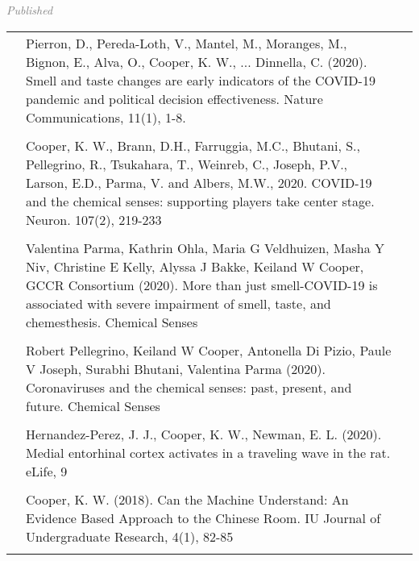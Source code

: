 \documentclass[11pt]{cooperCV_v1/cooperCV} %
\begin{document}
\begin{minipage}{\textwidth}
\begin{tabular}{ p{} %
                     p{} 
                     p{}}
    \end{tabular}
  

   
  \textcolor{gray}{{\emph{Published}}} 
  
   
    \begin{tabular}{ p{} %
                     p{} 
                     p{}} %
    
      \small\textcolor{gray}{{\emph{  }}} & {Pierron, D., Pereda-Loth, V., Mantel, M., Moranges, M., Bignon, E., Alva, O.,  Cooper, K. W., ... Dinnella, C. (2020). Smell and taste changes are early indicators of the COVID-19 pandemic and political decision effectiveness. Nature Communications, 11(1), 1-8.} & {\hfill \small{ }} \\ \\
    
      \small\textcolor{gray}{{\emph{  }}} & {Cooper, K. W., Brann, D.H., Farruggia, M.C., Bhutani, S., Pellegrino, R., Tsukahara, T., Weinreb, C., Joseph, P.V., Larson, E.D., Parma, V. and Albers, M.W., 2020. COVID-19 and the chemical senses: supporting players take center stage. Neuron. 107(2), 219-233} & {\hfill \small{ }} \\ \\
    
      \small\textcolor{gray}{{\emph{  }}} & {Valentina Parma, Kathrin Ohla, Maria G Veldhuizen, Masha Y Niv, Christine E Kelly, Alyssa J Bakke, Keiland W Cooper, GCCR Consortium (2020). More than just smell-COVID-19 is associated with severe impairment of smell, taste, and chemesthesis. Chemical Senses} & {\hfill \small{ }} \\ \\
    
      \small\textcolor{gray}{{\emph{  }}} & {Robert Pellegrino, Keiland W Cooper, Antonella Di Pizio, Paule V Joseph, Surabhi Bhutani, Valentina Parma (2020). Coronaviruses and the chemical senses: past, present, and future. Chemical Senses} & {\hfill \small{ }} \\ \\
    
      \small\textcolor{gray}{{\emph{  }}} & {Hernandez-Perez, J. J., Cooper, K. W., Newman, E. L. (2020). Medial entorhinal cortex activates in a traveling wave in the rat. eLife, 9} & {\hfill \small{ }} \\ \\
    
      \small\textcolor{gray}{{\emph{  }}} & {Cooper, K. W. (2018). Can the Machine Understand: An Evidence Based Approach to the Chinese Room. IU Journal of Undergraduate Research, 4(1), 82-85} & {\hfill \small{ }} \\ \\
     

\end{tabular}
\end{minipage}
\end{document}
